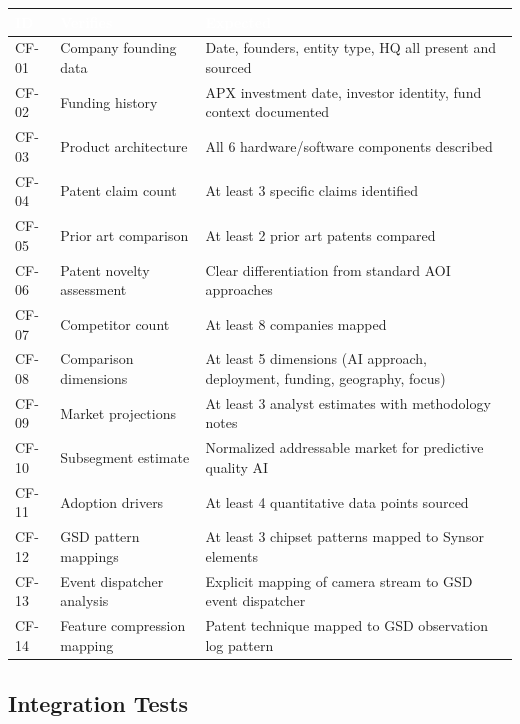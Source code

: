 \documentclass[11pt,letterpaper]{article}
\newcommand{\tableheader}[1]{\textbf{\sffamily\textcolor{white}{#1}}}
\begin{document}
\begin{center}
\begin{tabularx}{\textwidth}{C{1.2cm}L{4cm}X}
\toprule
{}
\tableheader{ID} & \tableheader{Verifies} & \tableheader{Expected} \\
\midrule
CF-01 & Company founding data & Date, founders, entity type, HQ all present and sourced \\
CF-02 & Funding history & APX investment date, investor identity, fund context documented \\
CF-03 & Product architecture & All 6 hardware/software components described \\
CF-04 & Patent claim count & At least 3 specific claims identified \\
CF-05 & Prior art comparison & At least 2 prior art patents compared \\
CF-06 & Patent novelty assessment & Clear differentiation from standard AOI approaches \\
CF-07 & Competitor count & At least 8 companies mapped \\
CF-08 & Comparison dimensions & At least 5 dimensions (AI approach, deployment, funding, geography, focus) \\
CF-09 & Market projections & At least 3 analyst estimates with methodology notes \\
CF-10 & Subsegment estimate & Normalized addressable market for predictive quality AI \\
CF-11 & Adoption drivers & At least 4 quantitative data points sourced \\
CF-12 & GSD pattern mappings & At least 3 chipset patterns mapped to Synsor elements \\
CF-13 & Event dispatcher analysis & Explicit mapping of camera stream to GSD event dispatcher \\
CF-14 & Feature compression mapping & Patent technique mapped to GSD observation log pattern \\
\bottomrule
\end{tabularx}
\end{center}

\subsection{Integration Tests}
\end{document}
